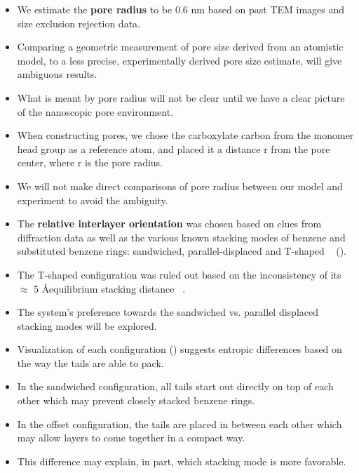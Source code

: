 \documentclass{article}
\newcommand{\angstrom}{\textup{\AA}}
\begin{document}
\begin{itemize}
    $\approx$ 4.1 \angstrom, which inspired separate systems starting with layer 
    spacings greater than 4 \angstrom.
    \item We estimate the \textbf{pore radius} to be 0.6 nm based on past TEM images 
    and size exclusion rejection data\cite{feng_scalable_2014,feng_thin_2016,
    zhou_supported_2005}.
    \item Comparing a geometric measurement of pore size derived from an 
    atomistic model, to a less precise, experimentally derived pore size estimate,
    will give ambiguous results.
    \item What is meant by pore radius will not be clear until we have a clear picture
    of the nanoscopic pore environment.
    \item When constructing pores, we chose the carboxylate carbon from the monomer
    head group as a reference atom, and placed it a distance r from the pore center,
    where r is the pore radius.  %
    \item We will not make direct comparisons of pore radius between our model 
    and experiment to avoid the ambiguity. 
    \item The \textbf{relative interlayer orientation} was chosen based on clues from 
    diffraction data as well as the various known stacking modes of benzene 
    and substituted benzene rings: sandwiched, parallel-displaced and T-shaped
    ~\cite{sinnokrot_estimates_2002} ().
    \item The T-shaped configuration was ruled out based on the inconsistency of
    its $\approx$ 5 \angstrom equilibrium stacking distance ~\cite{sinnokrot_estimates_2002}.
    \item The system's preference towards the sandwiched vs. parallel displaced 
    stacking modes will be explored.
    \item Visualization of each configuration ()
    suggests entropic differences based on the way the tails are able to pack.
    \item In the sandwiched configuration, all tails start out directly on top
    of each other which may prevent closely stacked benzene rings.
    \item In the offset configuration, the tails are placed in between each other 
    which may allow layers to come together in a compact way.
    \item This difference may explain, in part, which stacking mode is more favorable.
  \end{itemize}
\end{document}
